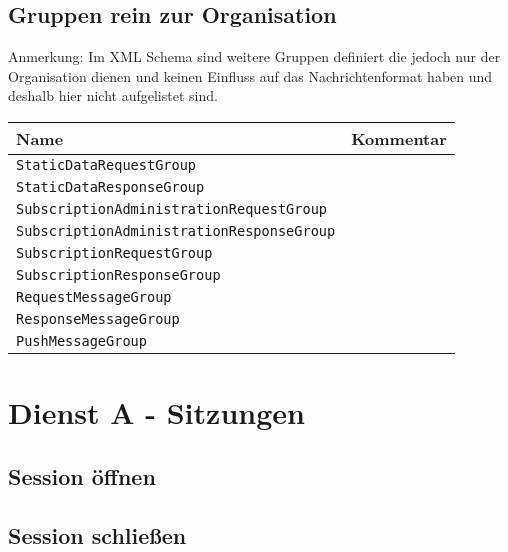 \subsection*{Gruppen rein zur Organisation}
Anmerkung: Im XML Schema sind weitere Gruppen definiert die jedoch nur der Organisation dienen und keinen Einfluss auf das Nachrichtenformat haben und deshalb hier nicht aufgelistet sind.
\begin{samepage}
\begin{flushleft}
\begin{tabularx}{\linewidth}{l>{\raggedright\arraybackslash}X}
\toprule
Name &  Kommentar \label{tab:miscGroups}\\
\midrule
\texttt{StaticDataRequestGroup} & \\
\texttt{StaticDataResponseGroup}& \\
\texttt{SubscriptionAdministrationRequestGroup} & \\
\texttt{SubscriptionAdministrationResponseGroup}& \\
\texttt{SubscriptionRequestGroup} & \\
\texttt{SubscriptionResponseGroup}& \\
\texttt{RequestMessageGroup}& \\
\texttt{ResponseMessageGroup}& \\
\texttt{PushMessageGroup}& \\
\bottomrule
\end{tabularx}\end{flushleft}\end{samepage}

\section{Dienst A - Sitzungen}
\label{sec:Nachrichten:DienstA}

\subsection*{Session öffnen}
\label{subsec:Nachrichten:DienstA:OpenSession}





\subsection*{Session schließen}
\label{subsec:Nachrichten:DienstA:CloseSession}






